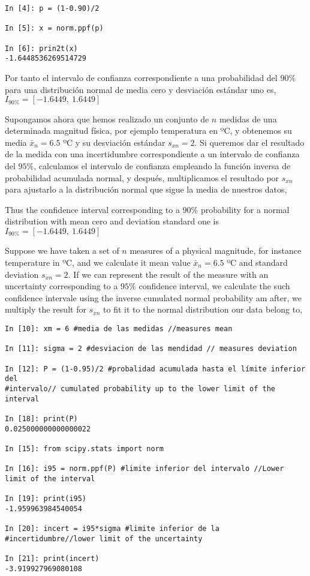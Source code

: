 \begin{center}
\begin{minipage}{0.5\textwidth}
	\begin{verbatim}
In [4]: p = (1-0.90)/2

In [5]: x = norm.ppf(p)

In [6]: prin2t(x)
-1.6448536269514729
\end{verbatim}
\end{minipage}
\end{center}
\begin{paracol}{2}
Por tanto el intervalo de confianza correspondiente a una probabilidad del $90\%$ para una distribución normal de media cero y desviación estándar uno es, \\$I_{90\%} =[-1.6449,\ 1.6449]$

Supongamos ahora que hemos realizado un conjunto de $n$ medidas de una determinada magnitud física, por ejemplo temperatura en ºC, y obtenemos su media $\bar{x}_n=6.5$ ºC y su desviación estándar $s_{xn}=2$. Si queremos dar el resultado de la medida con una incertidumbre correspondiente a un intervalo de confianza del $95\%$, calculamos el intervalo de confianza empleando la función inversa de probabilidad acumulada normal, y después, multiplicamos el resultado por $s_{xn}$ para ajustarlo a la distribución normal que sigue la media de nuestros datos, 

\switchcolumn
Thus the confidence interval corresponding to a $90\%$ probability for a normal distribution with mean cero and deviation standard one is $I_{90\%} =[-1.6449,\ 1.6449]$

Suppose we have taken a set of $n$ measures of a physical magnitude, for instance temperature in ºC, and we calculate it mean value $\bar{x}_n=6.5$ ºC and standard deviation $s_{xn}=2$. If we can represent the result of the measure with an uncertainty corresponding to a $95\%$ confidence interval, we calculate the such confidence intervale using the inverse cumulated normal probability am after, we multiply the result for $s_{xn}$ to fit it to the normal distribution our data belong to,   
\end{paracol}

\begin{verbatim}
In [10]: xm = 6 #media de las medidas //measures mean
			
In [11]: sigma = 2 #desviacion de las mendidad // measures deviation
			
In [12]: P = (1-0.95)/2 #probalidad acumulada hasta el límite inferior del 
#intervalo// cumulated probability up to the lower limit of the interval
			
In [18]: print(P)
0.025000000000000022
			
In [15]: from scipy.stats import norm
			
In [16]: i95 = norm.ppf(P) #limite inferior del intervalo //Lower limit of the interval
			
In [19]: print(i95)
-1.959963984540054
			
In [20]: incert = i95*sigma #limite inferior de la 
#incertidumbre//lower limit of the uncertainty 
			
In [21]: print(incert)
-3.919927969080108
\end{verbatim}

